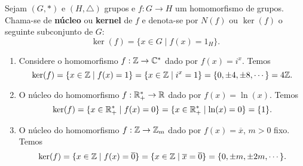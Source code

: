 \begin{definicao}
	Sejam $(G, *)$ e $(H, \triangle)$ grupos e $f : G \to H$ um homomorfismo de grupos. Chama-se de \textbf{n\'ucleo} ou \textbf{kernel} de $f$ e denota-se por $N(f)$ ou $\ker(f)$ o seguinte subconjunto de $G$:
	\[
		\ker(f) = \{x \in G \mid f(x) = 1_H\}.
	\]
\end{definicao}

\begin{exemplos}
	\begin{enumerate}[label={\roman*})]
		\item Considere o homomorfismo $f : \mathbb{Z} \to \mathbb{C}^*$ dado por $f(x) = i^x$. Temos
		\[
			\ker(f) = \{x \in \mathbb{Z} \mid f(x) = 1\} = \{x \in \mathbb{Z} \mid i^x = 1\} = \{0, \pm 4, \pm 8, \cdots\} = 4\mathbb{Z}.
		\]

		\item O n\'ucleo do homomorfismo $f : \mathbb{R}^*_+ \to \mathbb{R}$ dado por $f(x) = \ln(x)$. Temos
		\[
			\ker(f) = \{x \in \mathbb{R}^*_+ \mid f(x) = 0\} = \{x \in \mathbb{R}^*_+ \mid \ln(x) = 0\} = \{1\}.
		\]

		\item O n\'ucleo do homomorfismo $f : \mathbb{Z} \to \mathbb{Z}_m$ dado por $f(x) = \overline{x}$, $m > 0$ fixo. Temos
		\[
			\ker(f) = \{x \in \mathbb{Z} \mid f(x) = \overline{0}\} = \{x \in \mathbb{Z} \mid \overline{x} = \overline{0}\} = \{0, \pm m, \pm 2m, \cdots\}.
		\]
	\end{enumerate}
\end{exemplos}

